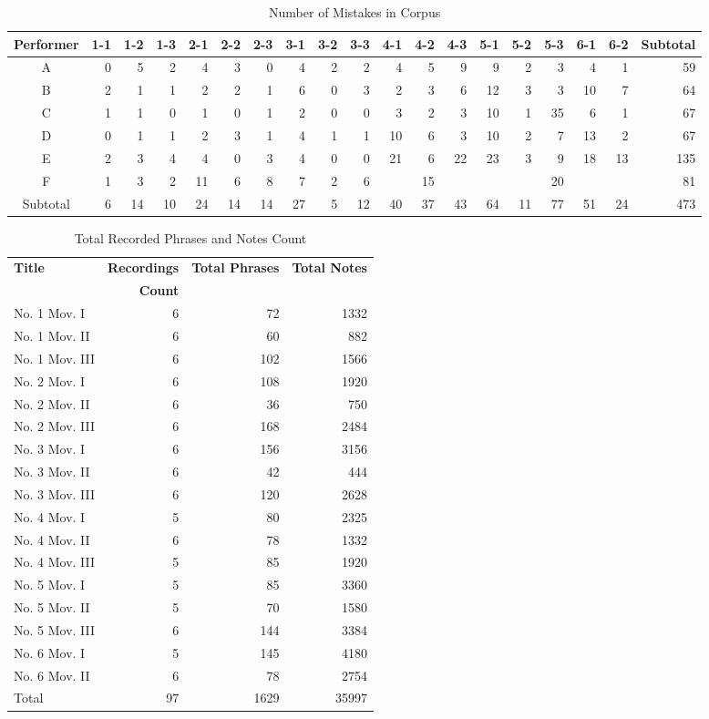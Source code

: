 \begin{table}
   \centering
   \caption{Number of Mistakes in Corpus}
   \label{tab:mistakes}
   \begin{tabular}{crrrrrrrrrrrrrrrrr|r}
      \hline
      Performer&1-1&1-2&1-3&2-1&2-2&2-3&3-1&3-2&3-3&4-1&4-2&4-3&5-1&5-2&5-3&6-1&6-2&Subtotal\\
      \hline
      A&0&5&2&4&3&0&4&2&2&4&5&9&9&2&3&4&1&59\\
      B&2&1&1&2&2&1&6&0&3&2&3&6&12&3&3&10&7&64\\
      C&1&1&0&1&0&1&2&0&0&3&2&3&10&1&35&6&1&67\\
      D&0&1&1&2&3&1&4&1&1&10&6&3&10&2&7&13&2&67\\
      E&2&3&4&4&0&3&4&0&0&21&6&22&23&3&9&18&13&135\\
      F&1&3&2&11&6&8&7&2&6&&15&&&&20&&&81\\
      \hline
      Subtotal&6&14&10&24&14&14&27&5&12&40&37&43&64&11&77&51&24&473\\
   \end{tabular}
\end{table}
\begin{table}[bp]
   \centering
   \caption{Total Recorded Phrases and Notes Count}
   \label{tab:corpuscount}
   \begin{tabular}{lrrr}
      \hline
      \bf Title&\bf Recordings&\bf Total Phrases&\bf Total Notes\\
      &\bf Count&&\\
      \hline
      No. 1 Mov. I&6&72&1332\\
      No. 1 Mov. II&6&60&882\\
      No. 1 Mov. III&6&102&1566\\
      No. 2 Mov. I&6&108&1920\\
      No. 2 Mov. II&6&36&750\\
      No. 2 Mov. III&6&168&2484\\
      No. 3 Mov. I&6&156&3156\\
      No. 3 Mov. II&6&42&444\\
      No. 3 Mov. III&6&120&2628\\
      No. 4 Mov. I&5&80&2325\\
      No. 4 Mov. II&6&78&1332\\
      No. 4 Mov. III&5&85&1920\\
      No. 5 Mov. I&5&85&3360\\
      No. 5 Mov. II&5&70&1580\\
      No. 5 Mov. III&6&144&3384\\
      No. 6 Mov. I&5&145&4180\\
      No. 6 Mov. II&6&78&2754\\
      \hline
      Total&97&1629&35997\\
      \hline
   \end{tabular}
\end{table}

